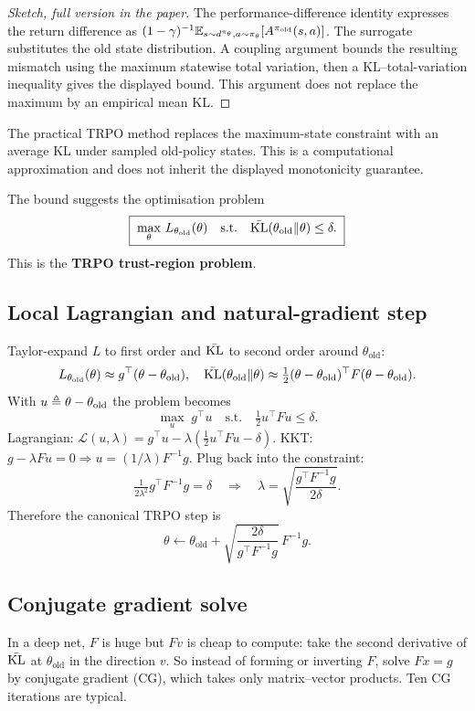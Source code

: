 \documentclass[11pt,oneside]{scrbook}
\begin{document}
\begin{proof}[Sketch, full version in the paper]
The performance-difference identity expresses the return difference as
$(1-\gamma)^{-1}\mathbb{E}_{s\sim d^{\pi_\theta},a\sim\pi_\theta}[A^{\pi_\mathrm{old}}(s,a)]$.
The surrogate substitutes the old state distribution. A coupling argument
bounds the resulting mismatch using the maximum statewise total variation,
then a KL--total-variation inequality gives the displayed bound. This
argument does not replace the maximum by an empirical mean KL.
\end{proof}

The practical TRPO method replaces the maximum-state constraint with an
average KL under sampled old-policy states. This is a computational
approximation and does not inherit the displayed monotonicity guarantee.

The bound suggests the optimisation problem
\[
  \boxed{\;\max_\theta\, L_{\theta_\text{old}}(\theta) \quad \text{s.t.}\quad \bar{\mathrm{KL}}(\theta_\text{old} \| \theta) \le \delta.\;}
\]
This is the \textbf{TRPO trust-region problem}.

\subsection*{Local Lagrangian and natural-gradient step}

Taylor-expand $L$ to first order and $\bar{\mathrm{KL}}$ to second order around $\theta_\text{old}$:
\[
  L_{\theta_\text{old}}(\theta) \approx g^\top(\theta - \theta_\text{old}), \quad
  \bar{\mathrm{KL}}(\theta_\text{old}\|\theta) \approx \tfrac{1}{2}(\theta-\theta_\text{old})^\top F (\theta-\theta_\text{old}).
\]
With $u \triangleq \theta - \theta_\text{old}$ the problem becomes
\[
  \max_u\; g^\top u \quad \text{s.t.}\quad \tfrac12 u^\top F u \le \delta.
\]
Lagrangian: $\mathcal{L}(u, \lambda) = g^\top u - \lambda (\tfrac12 u^\top F u - \delta)$. KKT: $g - \lambda F u = 0 \Rightarrow u = (1/\lambda) F^{-1} g$. Plug back into the constraint:
\[
  \tfrac{1}{2\lambda^2} g^\top F^{-1} g = \delta \quad\Longrightarrow\quad \lambda = \sqrt{\frac{g^\top F^{-1} g}{2\delta}}.
\]
Therefore the canonical TRPO step is
\[
  \boxed{\;\theta \leftarrow \theta_\text{old} + \sqrt{\frac{2\delta}{g^\top F^{-1} g}}\, F^{-1} g.\;}
\]

\subsection*{Conjugate gradient solve}

In a deep net, $F$ is huge but $F v$ is cheap to compute: take the second derivative of $\bar{\mathrm{KL}}$ at $\theta_\text{old}$ in the direction $v$. So instead of forming or inverting $F$, solve $F x = g$ by conjugate gradient (CG), which takes only matrix--vector products. Ten CG iterations are typical.
\end{document}

